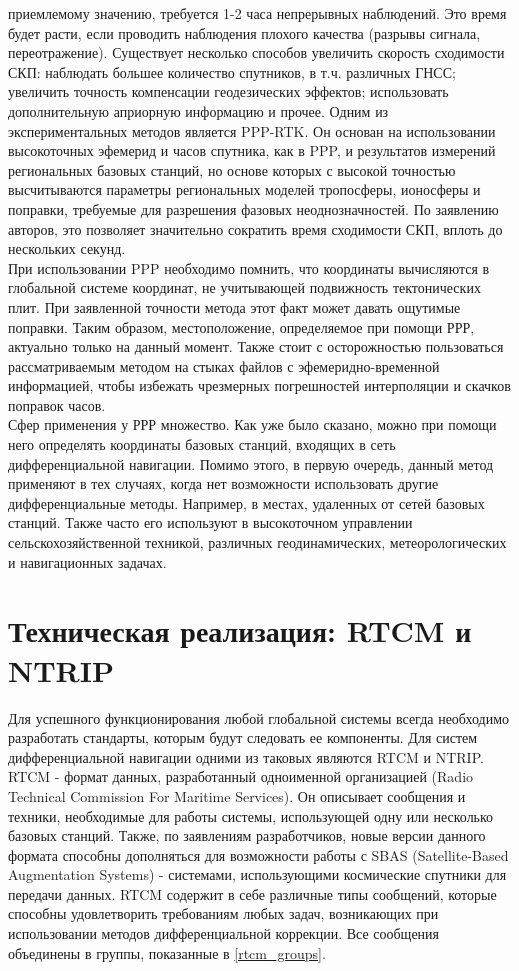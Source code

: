 \documentclass[a4paper,12pt]{report}
\begin{document}
приемлемому значению, требуется 1-2 часа непрерывных наблюдений. Это время будет расти, если проводить наблюдения плохого качества (разрывы 
сигнала, переотражение). Существует несколько способов увеличить скорость сходимости СКП: наблюдать большее количество спутников, в т.ч. 
различных ГНСС; увеличить точность компенсации геодезических эффектов; использовать дополнительную априорную информацию и прочее. Одним из 
экспериментальных методов является PPP-RTK. Он основан на использовании высокоточных эфемерид и часов спутника, как в PPP, и результатов 
измерений региональных базовых станций, но основе которых с высокой точностью высчитываются параметры региональных моделей тропосферы, 
ионосферы и поправки, требуемые для разрешения фазовых неоднозначностей. По заявлению авторов, это позволяет значительно сократить время
сходимости СКП, вплоть до нескольких секунд. \cite{ppp-rtk} \\
При использовании PPP необходимо помнить, что координаты вычисляются в глобальной системе координат, не учитывающей подвижность тектонических 
плит. При заявленной точности метода этот факт может давать ощутимые поправки. Таким образом, местоположение, определяемое при помощи РРР, 
актуально только на данный момент. Также стоит с осторожностью пользоваться рассматриваемым методом на стыках файлов с эфемеридно-временной 
информацией, чтобы избежать чрезмерных погрешностей интерполяции и скачков поправок часов. \\
Сфер применения у РРР множество. Как уже было сказано, можно при помощи него определять координаты базовых станций, входящих в сеть 
дифференциальной навигации. Помимо этого, в первую очередь, данный метод применяют в тех случаях, когда нет возможности использовать другие 
дифференциальные методы. Например, в местах, удаленных от сетей базовых станций. Также часто его используют в высокоточном управлении 
сельскохозяйственной техникой, различных геодинамических, метеорологических и навигационных задачах. 

\section*{Техническая реализация: RTCM и NTRIP}
Для успешного функционирования любой глобальной системы всегда необходимо разработать стандарты, которым будут следовать ее компоненты.
Для систем дифференциальной навигации одними из таковых являются RTCM и NTRIP. \\
RTCM - формат данных, разработанный одноименной организацией (Radio Technical Commission For Maritime Services). Он описывает сообщения и 
техники, необходимые для работы системы, использующей одну или несколько базовых станций. Также, по заявлениям разработчиков, новые версии 
данного формата способны дополняться для возможности работы с SBAS (Satellite-Based Augmentation Systems) - системами, использующими 
космические спутники для передачи данных. RTCM содержит в себе различные типы сообщений, которые способны удовлетворить требованиям любых 
задач, возникающих при использовании методов дифференциальной коррекции. Все сообщения объединены в группы, показанные в \ref{rtcm_groups}.
\end{document}
